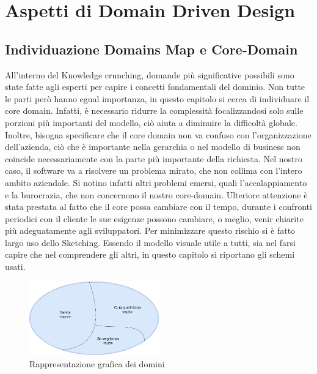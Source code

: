 \chapter{Aspetti di Domain Driven Design}

    \section{Individuazione Domains Map e Core-Domain}	
    All'interno del Knowledge crunching, domande più significative possibili sono state fatte agli esperti per capire i concetti fondamentali del dominio.
    Non tutte le parti però hanno egual importanza, in questo capitolo si cerca di individuare il core domain. Infatti, è necessario ridurre la complessità focalizzandosi solo sulle porzioni più importanti del modello, ciò aiuta a diminuire la difficoltà globale.
    Inoltre, bisogna specificare che il core domain non va confuso con l’organizzazione dell'azienda, ciò che è importante nella gerarchia o nel modello di business non coincide necessariamente con la parte più importante della richiesta. Nel nostro caso, il software va a risolvere un problema mirato, che non collima con l'intero ambito aziendale. Si notino infatti altri problemi emersi, quali l'accalappiamento e la burocrazia, che non concernono il nostro core-domain.
    Ulteriore attenzione è stata prestata al fatto che il core possa cambiare con il tempo, durante i confronti periodici con il cliente le sue esigenze possono cambiare, o meglio, venir chiarite più adeguatamente agli sviluppatori.
    Per minimizzare questo rischio si è fatto largo uso dello	Sketching. Essendo il modello visuale utile a tutti, sia nel farsi capire che nel comprendere gli altri, in questo capitolo si riportano gli schemi usati.
    
    
    \begin{figure}[ht]
        \caption{Rappresentazione grafica dei domini}
        \centering
        \includegraphics[width=0.5\textwidth]{DrawIo/domainsMap.png}
    \end{figure}
    
